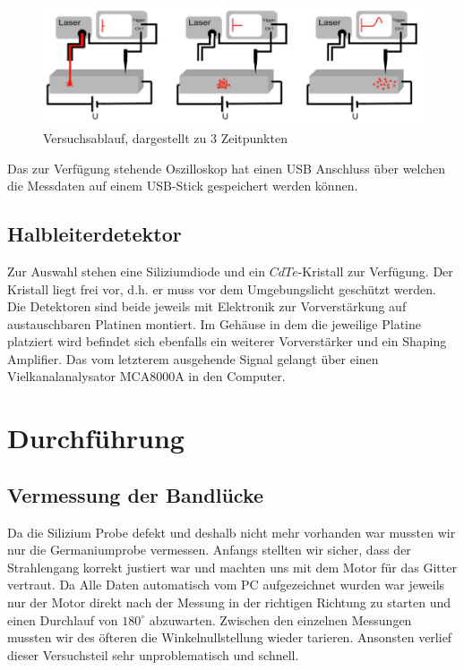 \documentclass[12pt]{article}
\begin{document}
\begin{figure}[H]
\centering
\includegraphics[width=0.9\linewidth]{pictures/haynesAufbau.eps}
\caption{Versuchsablauf, dargestellt zu 3 Zeitpunkten}
\end{figure}

Das zur Verfügung stehende Oszilloskop hat einen USB Anschluss über welchen die Messdaten auf einem USB-Stick gespeichert werden können.

\subsection{Halbleiterdetektor}
Zur Auswahl stehen eine Siliziumdiode und ein $CdTe$-Kristall zur Verfügung. Der Kristall liegt frei vor, d.h. er muss vor dem Umgebungslicht geschützt werden. Die Detektoren sind beide jeweils mit Elektronik zur Vorverstärkung auf austauschbaren Platinen montiert. Im Gehäuse in dem die jeweilige Platine platziert wird befindet sich ebenfalls ein weiterer Vorverstärker und ein Shaping Amplifier. Das vom letzterem ausgehende Signal gelangt über einen Vielkanalanalysator MCA8000A in den Computer.

\section{Durchführung}
\subsection{Vermessung der Bandlücke}
Da die Silizium Probe defekt und deshalb nicht mehr vorhanden war mussten wir nur die Germaniumprobe vermessen.
Anfangs stellten wir sicher, dass der Strahlengang korrekt justiert war und machten uns mit dem Motor für das Gitter vertraut.
Da Alle Daten automatisch vom PC aufgezeichnet wurden war jeweils nur der Motor direkt nach der Messung in der richtigen Richtung zu starten und einen Durchlauf von $180^\circ$ abzuwarten. Zwischen den einzelnen Messungen mussten wir des öfteren die Winkelnullstellung wieder tarieren. Ansonsten verlief dieser Versuchsteil sehr unproblematisch und schnell.\\
\end{document}
